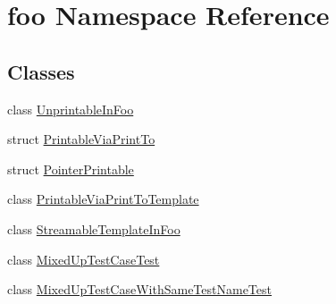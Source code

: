 \hypertarget{namespacefoo}{\section{foo \-Namespace \-Reference}
\label{d3/d0d/namespacefoo}
}
\subsection*{\-Classes}
\begin{DoxyCompactItemize}
\item 
class \hyperlink{classfoo_1_1UnprintableInFoo}{\-Unprintable\-In\-Foo}
\item 
struct \hyperlink{structfoo_1_1PrintableViaPrintTo}{\-Printable\-Via\-Print\-To}
\item 
struct \hyperlink{structfoo_1_1PointerPrintable}{\-Pointer\-Printable}
\item 
class \hyperlink{classfoo_1_1PrintableViaPrintToTemplate}{\-Printable\-Via\-Print\-To\-Template}
\item 
class \hyperlink{classfoo_1_1StreamableTemplateInFoo}{\-Streamable\-Template\-In\-Foo}
\item 
class \hyperlink{classfoo_1_1MixedUpTestCaseTest}{\-Mixed\-Up\-Test\-Case\-Test}
\item 
class \hyperlink{classfoo_1_1MixedUpTestCaseWithSameTestNameTest}{\-Mixed\-Up\-Test\-Case\-With\-Same\-Test\-Name\-Test}
\end{DoxyCompactItemize}
